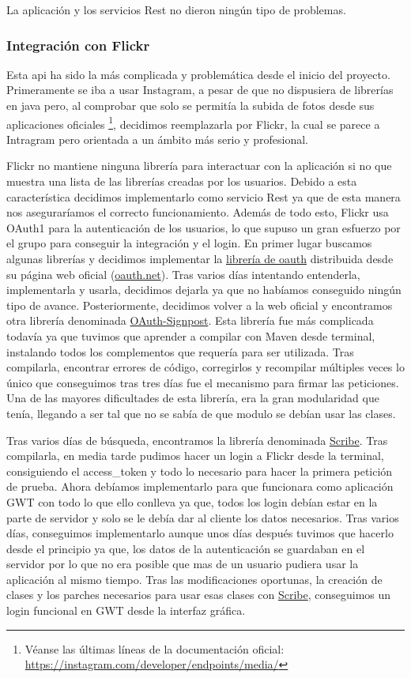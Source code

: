 \documentclass{scrartcl}
\begin{document}
La aplicación y los servicios Rest no dieron ningún tipo de problemas.

\subsubsection{Integración con Flickr}
Esta api ha sido la más complicada y problemática desde el inicio del proyecto. Primeramente se iba a usar Instagram, a pesar de que no dispusiera de librerías en java pero, al comprobar que solo se permitía la subida de fotos desde sus aplicaciones oficiales \footnote{Véanse las últimas líneas de la documentación oficial: \url{https://instagram.com/developer/endpoints/media/}}, decidimos reemplazarla por Flickr, la cual se parece a Intragram pero orientada a un ámbito más serio y profesional.

Flickr no mantiene ninguna librería para interactuar con la aplicación si no que muestra una lista de las librerías creadas por los usuarios. Debido a esta característica decidimos implementarlo como servicio Rest ya que de esta manera nos aseguraríamos el correcto funcionamiento. Además de todo esto, Flickr usa OAuth1 para la autenticación de los usuarios, lo que supuso un gran esfuerzo por el grupo para conseguir la integración y el login. En primer lugar buscamos algunas librerías y decidimos implementar la  \href{http://oauth.googlecode.com/svn/code/java/core/}{librería de oauth} distribuida desde su página web oficial (\url{oauth.net}). Tras varios días intentando entenderla, implementarla y usarla, decidimos dejarla ya que no habíamos conseguido ningún tipo de avance. Posteriormente, decidimos volver a la web oficial y encontramos otra librería denominada \href{https://github.com/mttkay/signpost}{OAuth-Signpost}. Esta librería fue más complicada todavía ya que tuvimos que aprender a compilar con Maven desde terminal, instalando todos los complementos que requería para ser utilizada. Tras compilarla, encontrar errores de código, corregirlos y recompilar múltiples veces lo único que conseguimos tras tres días fue el mecanismo para firmar las peticiones. Una de las mayores dificultades de esta librería, era la gran modularidad que tenía, llegando a ser tal que no se sabía de que modulo se debían usar las clases. 

Tras varios días de búsqueda, encontramos la librería denominada \href{https://github.com/fernandezpablo85/scribe-java}{Scribe}. Tras compilarla, en media tarde pudimos hacer un login a Flickr desde la terminal, consiguiendo el access\_token y todo lo necesario para hacer la primera petición de prueba. Ahora debíamos implementarlo para que funcionara como aplicación GWT con todo lo que ello conlleva ya que, todos los login debían estar en la parte de servidor y solo se le debía dar al cliente los datos necesarios. Tras varios días, conseguimos implementarlo aunque unos días después tuvimos que hacerlo desde el principio ya que, los datos de la autenticación se guardaban en el servidor por lo que no era posible que mas de un usuario pudiera usar la aplicación al mismo tiempo. Tras las modificaciones oportunas, la creación de clases y los parches necesarios para usar esas clases con \href{https://github.com/fernandezpablo85/scribe-java}{Scribe}, conseguimos un login funcional en GWT desde la interfaz gráfica.
\end{document}

